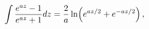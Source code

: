 \[\int\frac{e^{az}-1}{e^{az}+1}dz=\frac{2}{a}\mathop{\ln\/}\nolimits\!\left(e^{%
az/2}+e^{-az/2}\right),\]